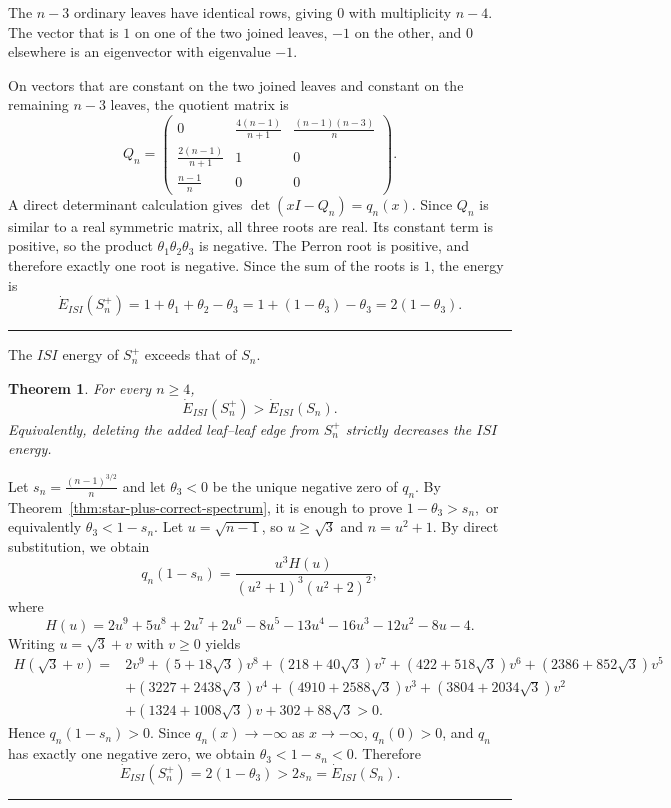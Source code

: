 \documentclass[12pt,twoside]{article}
\renewenvironment{proof}{{\noindent\bfseries Proof.}}{\qed}
\newtheorem{theorem}{Theorem}[section]
\def\qed{\nolinebreak\hfill\rule{.2cm}{.2cm}\par\addvspace{.5cm}}
\begin{document}
\begin{proof}
	The $n-3$ ordinary leaves have identical rows, giving $0$ with multiplicity $n-4$. The vector that is $1$ on one of the two joined leaves, $-1$ on the other, and $0$ elsewhere is an eigenvector with eigenvalue $-1$. 
	
	On vectors that are constant on the two joined leaves and constant on the remaining $n-3$ leaves, the quotient matrix is
	$$
	Q_n=
	\begin{pmatrix}
		0&\frac{4(n-1)}{n+1}&\frac{(n-1)(n-3)}{n}\\
		\frac{2(n-1)}{n+1}&1&0\\
		\frac{n-1}{n}&0&0
	\end{pmatrix}.
	$$
	A direct determinant calculation gives
	$
	\det(xI-Q_n)=q_n(x).
	$
	Since $Q_n$ is similar to a real symmetric matrix, all three roots are real. Its constant term is positive, so the product $\theta_1\theta_2\theta_3$ is negative. The Perron root is positive, and therefore exactly one root is negative. Since the sum of the roots is $1$, the energy is
	$$
	\dot E_{ISI}(S_n^+)=1+\theta_1+\theta_2-\theta_3
	=1+(1-\theta_3)-\theta_3
	=2(1-\theta_3).
	$$
\end{proof}



The $ISI$ energy of $S_n^+$ exceeds that of $S_n.$

\begin{theorem}\label{thm:star-plus-energy-increase}
	For every $n\geq4$,
	$$
	\dot E_{ISI}(S_n^+)>
	\dot E_{ISI}(S_n).
	$$
	Equivalently, deleting the added leaf--leaf edge from $S_n^+$ strictly decreases the $ISI$ energy.
\end{theorem}

\begin{proof}
	Let
	$
	s_n=\tfrac{(n-1)^{3/2}}{n}
	$
	and let $\theta_3<0$ be the unique negative zero of $q_n$. By Theorem~\ref{thm:star-plus-correct-spectrum}, it is enough to prove
	$
	1-\theta_3>s_n,
	$
	or equivalently
	$
	\theta_3<1-s_n.
	$
	Let $u=\sqrt{n-1}$, so $u\geq\sqrt3$ and $n=u^2+1$. By direct substitution, we obtain
	$$
	q_n(1-s_n)
	=
	\frac{u^3H(u)}{(u^2+1)^3(u^2+2)^2},
	$$
	where
	$$
	H(u)=2u^9+5u^8+2u^7+2u^6-8u^5-13u^4-16u^3-12u^2-8u-4.
	$$
	Writing $u=\sqrt3+v$ with $v\geq0$ yields
	$$
	\begin{aligned}
		H(\sqrt3+v)={}&2v^9+(5+18\sqrt3)v^8+(218+40\sqrt3)v^7+(422+518\sqrt3)v^6+(2386+852\sqrt3)v^5\\
		&+(3227+2438\sqrt3)v^4+(4910+2588\sqrt3)v^3+(3804+2034\sqrt3)v^2\\
		&+(1324+1008\sqrt3)v +302+88\sqrt3>0.
	\end{aligned}
	$$
	Hence $q_n(1-s_n)>0$. Since $q_n(x)\to-\infty$ as $x\to-\infty$, $q_n(0)>0$, and $q_n$ has exactly one negative zero, we obtain
	$
	\theta_3<1-s_n<0.
	$
	Therefore
	$$
	\dot E_{ISI}(S_n^+)=2(1-\theta_3)>2s_n=\dot E_{ISI}(S_n).
	$$
\end{proof}
\end{document}
